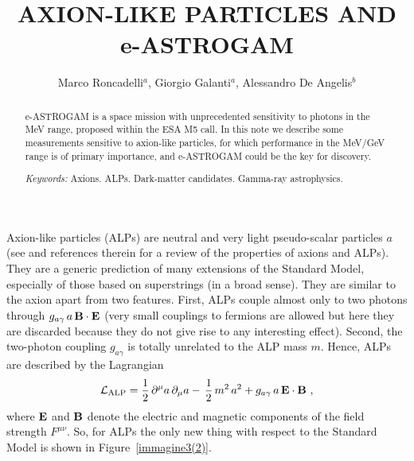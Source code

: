 \documentclass[aps,12pt,tightenlines,amsmath,amssymb]{revtex4}
\begin{document}
\title{AXION-LIKE PARTICLES AND e-ASTROGAM}




\author{Marco Roncadelli$^{a}$, Giorgio Galanti$^{a}$, Alessandro De Angelis$^b$}






\begin{abstract}

 e-ASTROGAM \cite{ea} is a space mission with unprecedented sensitivity to photons in the MeV range, proposed within the ESA M5 call. In this note we describe some 
measurements sensitive to axion-like particles, for which performance in the MeV/GeV range is of primary importance, and e-ASTROGAM could be the key for discovery.

{\em Keywords:} Axions. ALPs. Dark-matter candidates. Gamma-ray astrophysics.



\end{abstract}


\maketitle



Axion-like particles (ALPs) are neutral and very light pseudo-scalar particles $a$ (see \cite{alp1} and references therein for a review of the properties of axions and ALPs). They are a generic prediction 
of many extensions of the Standard Model, especially of those based on superstrings (in a broad sense). They are similar to the axion apart from two features. First, ALPs couple almost only to two photons through $g_{a \gamma} \, a \, {\bf B} \cdot {\bf E}$ (very small couplings to fermions are allowed but here they are discarded because they do not give rise to any interesting effect). Second, the two-photon coupling $g_{a \gamma}$ is totally unrelated to the ALP mass $m$. Hence, ALPs are described by the Lagrangian 
\begin{equation}
\label{t1}
{\cal L}_{\rm ALP} = \frac{1}{2} \, \partial^{\mu} a \, \partial_{\mu} a - \, \frac{1}{2} \, m^2 \, a^2 + g_{a \gamma} \, a \, {\bf E} \cdot {\bf B}~,
\end{equation}
where ${\bf E}$ and ${\bf B}$ denote the electric and magnetic components of the field strength $F^{\mu \nu}$. So, for ALPs the only new thing with respect to the Standard Model is shown in Figure~\ref{immagine3(2)}.
\end{document}
